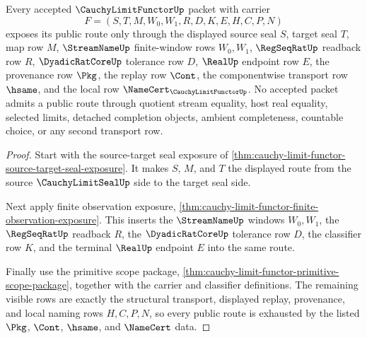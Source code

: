 \begin{theorem}
\label{thm:cauchy-limit-functor-seal-route-totality}
Every accepted $\CauchyLimitFunctorUp$ packet with carrier
$$
F=(S,T,M,W_0,W_1,R,D,K,E,H,C,P,N)
$$
exposes its public route only through the displayed source seal $S$, target seal $T$, map row $M$, $\StreamNameUp$ finite-window rows $W_0,W_1$, $\RegSeqRatUp$ readback row $R$, $\DyadicRatCoreUp$ tolerance row $D$, $\RealUp$ endpoint row $E$, the provenance row $\Pkg$, the replay row $\Cont$, the componentwise transport row $\hsame$, and the local row $\NameCert_{\CauchyLimitFunctorUp}$. No accepted packet admits a public route through quotient stream equality, host real equality, selected limits, detached completion objects, ambient completeness, countable choice, or any second transport row.
\end{theorem}
\begin{proof}
Start with the source-target seal exposure of \autoref{thm:cauchy-limit-functor-source-target-seal-exposure}. It makes $S$, $M$, and $T$ the displayed route from the source $\CauchyLimitSealUp$ side to the target seal side.

Next apply finite observation exposure, \autoref{thm:cauchy-limit-functor-finite-observation-exposure}. This inserts the $\StreamNameUp$ windows $W_0,W_1$, the $\RegSeqRatUp$ readback $R$, the $\DyadicRatCoreUp$ tolerance row $D$, the classifier row $K$, and the terminal $\RealUp$ endpoint $E$ into the same route.

Finally use the primitive scope package, \autoref{thm:cauchy-limit-functor-primitive-scope-package}, together with the carrier and classifier definitions. The remaining visible rows are exactly the structural transport, displayed replay, provenance, and local naming rows $H,C,P,N$, so every public route is exhausted by the listed $\Pkg$, $\Cont$, $\hsame$, and $\NameCert$ data.
\end{proof}

